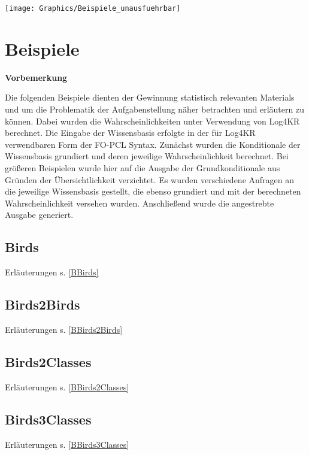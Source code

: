 \documentclass[a4paper, 11pt]{book}
\begin{document}
\texttt{[image: Graphics/Beispiele\_unausfuehrbar]}
\begin{figure}[h]
	
\end{figure}




\chapter{Beispiele}
\label{examples}

\textbf{Vorbemerkung}

\noindent
Die folgenden Beispiele dienten der Gewinnung statistisch relevanten Materials und um die Problematik der Aufgabenstellung näher betrachten und erläutern zu können. Dabei wurden die Wahrscheinlichkeiten unter Verwendung von Log4KR berechnet. Die Eingabe der Wissensbasis erfolgte in der für Log4KR verwendbaren Form der FO-PCL Syntax. Zunächst wurden die Konditionale der Wissensbasis grundiert und deren jeweilige Wahrscheinlichkeit berechnet. Bei größeren Beispielen wurde hier auf die Ausgabe der Grundkonditionale aus Gründen der Übersichtlichkeit verzichtet.
Es wurden verschiedene Anfragen an die jeweilige Wissensbasis gestellt, die ebenso grundiert und mit der berechneten Wahrscheinlichkeit versehen wurden.
Anschließend wurde die angestrebte Ausgabe  generiert. 

\section{Birds} Erläuterungen s. \ref{BBirds}
\label{Birds}

\newpage

\section{Birds2Birds} Erläuterungen s. \ref{BBirds2Birds}
\label{Birds2Birds}

\newpage

\section{Birds2Classes} Erläuterungen s. \ref{BBirds2Classes}
\label{Birds2Classes}

\newpage

\section{Birds3Classes} Erläuterungen s. \ref{BBirds3Classes}
\label{Birds3Classes}

\newpage
\end{document}
